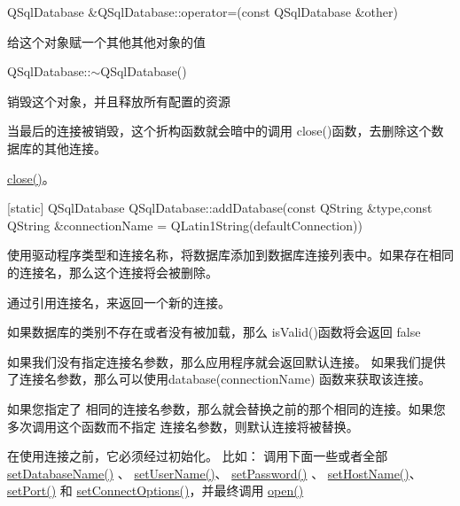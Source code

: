QSqlDatabase \&QSqlDatabase::operator=(const QSqlDatabase \&other)

给这个对象赋一个其他其他对象的值

QSqlDatabase::$\sim$QSqlDatabase()

销毁这个对象，并且释放所有配置的资源 

\begin{notice}
当最后的连接被销毁，这个折构函数就会暗中的调用 close()函数，去删除这个数据库的其他连接。
\end{notice}

\begin{seeAlso}
\href{https://github.com/QtDocumentCN/QtDocumentCN/blob/master/Src/S/QSqlDatabase/QSqlDatabase.md#void-qsqldatabaseclose}{close()}。
\end{seeAlso}



[static] QSqlDatabase QSqlDatabase::addDatabase(const QString \&type,const QString \&connectionName = QLatin1String(defaultConnection))

使用驱动程序类型和连接名称，将数据库添加到数据库连接列表中。如果存在相同的连接名，那么这个连接将会被删除。

通过引用连接名，来返回一个新的连接。

如果数据库的类别不存在或者没有被加载，那么 isValid()函数将会返回 false

如果我们没有指定连接名参数，那么应用程序就会返回默认连接。 如果我们提供了连接名参数，那么可以使用database(connectionName) 函数来获取该连接。

\begin{notice}[警告]
如果您指定了 相同的连接名参数，那么就会替换之前的那个相同的连接。如果您多次调用这个函数而不指定 连接名参数，则默认连接将被替换。
\end{notice}


在使用连接之前，它必须经过初始化。
比如： 调用下面一些或者全部 \href{https://github.com/QtDocumentCN/QtDocumentCN/blob/master/Src/S/QSqlDatabase/QSqlDatabase.md#void-qsqldatabasesetdatabasenameconst-qstring-name}{setDatabaseName()} 、 \href{https://github.com/QtDocumentCN/QtDocumentCN/blob/master/Src/S/QSqlDatabase/QSqlDatabase.md#void-qsqldatabasesetusernameconst-qstring-name}{setUserName()}、 \href{https://github.com/QtDocumentCN/QtDocumentCN/blob/master/Src/S/QSqlDatabase/QSqlDatabase.md#void-qsqldatabasesetpasswordconst-qstring-password}{setPassword()} 、 \href{https://github.com/QtDocumentCN/QtDocumentCN/blob/master/Src/S/QSqlDatabase/QSqlDatabase.md#void-qsqldatabasesethostnameconst-qstring-host}{setHostName()}、 \href{https://github.com/QtDocumentCN/QtDocumentCN/blob/master/Src/S/QSqlDatabase/QSqlDatabase.md#void-qsqldatabasesetportint-port}{setPort()} 和 \href{https://github.com/QtDocumentCN/QtDocumentCN/blob/master/Src/S/QSqlDatabase/QSqlDatabase.md#void-qsqldatabasesetconnectoptionsconst-qstring-options--qstring}{setConnectOptions()}，并最终调用 \href{https://github.com/QtDocumentCN/QtDocumentCN/blob/master/Src/S/QSqlDatabase/QSqlDatabase.md#bool-qsqldatabaseopen}{open()}



